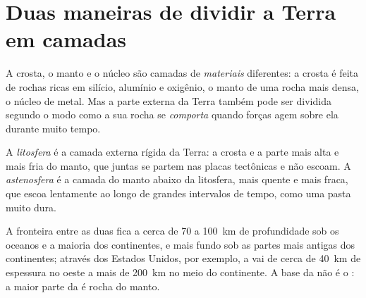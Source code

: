 \section{Duas maneiras de dividir a Terra em camadas}

A crosta, o manto e o núcleo são camadas de \emph{materiais} diferentes: a
crosta é feita de rochas ricas em silício, alumínio e oxigênio, o manto de
uma rocha mais densa, o núcleo de metal. Mas a parte externa da Terra também
pode ser dividida segundo o modo como a sua rocha se \emph{comporta} quando
forças agem sobre ela durante muito tempo.

\begin{definition}\label{def:g11:lithosphere-asthenosphere:lithosphere}
A \emph{litosfera} é a camada externa rígida da Terra: a
crosta e a parte mais alta e mais fria do manto, que juntas se partem nas
placas tectônicas e não escoam. A \emph{astenosfera} é a
camada do manto abaixo da litosfera, mais quente e mais fraca, que escoa
lentamente ao longo de grandes intervalos de tempo, como uma pasta muito
dura.
\end{definition}

A fronteira entre as duas fica a cerca de 70 a \qty{100}{km} de
profundidade sob os oceanos e a maioria dos continentes, e mais fundo sob as
partes mais antigas dos continentes; através dos Estados Unidos, por
exemplo, a  vai de cerca de \qty{40}{km} de espessura no oeste a
mais de \qty{200}{km} no meio do continente. A base da  não é o
: a maior parte da  é rocha do manto.

